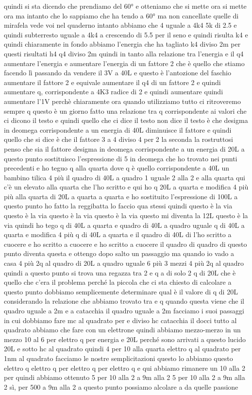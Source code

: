 \begin{soluzione}
   quindi si sta dicendo che prendiamo del 60° e otteniamo che si mette ora si mette ora ma intanto che lo sappiamo che ha tendo a 60° ma non cancellate quelle di mirafela vede voi nel quaderno intanto abbiamo che 4 uguale a 4k4 5k di 2.5 e quindi subterresto uguale a 4k4 a crescendo di 5.5 per il seno e quindi risulta k4 e quindi chiaramente in fondo abbiamo l'energia che ha tagliato k4 diviso 2m per questi risultati h4 q4 diviso 2m quindi in tanto alla relazione tra l'energia e il q4 aumentare l'energia e aumentare l'energia di un fattore 2 che è quello che stiamo facendo lì passando da vendere il 3V a 40L e questo è l'antozione del faschio aumentare il fattore 2 e equivale aumentare il q4 di un fattore 2 e quindi aumentare q, corrispondente a 4K3 radice di 2 e quindi aumentare quindi aumentare l'1V perchè chiaramente ora quando utilizziamo tutto ci ritroveremo sempre q questo è un giorno fatto una relazione tra q corrispondente ai valori che ci dicono il testo e quindi quello che ci dice il testo non dice il testo è che desigma in deomega corrispondente a un energia di 40L diminuisce il fattore e quindi quello che si dice è che il fattore 3 a 4 diviso 4 per 2 la seconda la rostruttosi penso che sia il fattore desigma in deomega corrispondente a un energia di 20L a questo punto sostituisco l'espressione di 5 in deomega che ho trovato nei punti precedenti e ho teguo q alla quarta dove q è quello corrispondente a 40L un bambino tilica 4 più il quadro di 40L a quadro 1 uguale 2 alla 2 e alla quarta qui c'è un elevato alla quarta che l'ho scritto e qui ho q 20L a quarta e modifica 4 più più alla quarta di 20L a quarta a quarta e ho sostituito l'espressione di 100L a questo punto ho fatto la reggibatta lo faccio qua stessi quindi questo è la via questo è la via questo è la via questo è la via questo mi diventa la 12L questo è la via quindi ho tego q di 40L a quarta e quadro di 40L a quadro uguale q di 40L a quarta e modifica 4 più q di 40L a quarta e il quadro di 40L di l'ho scritto a cuocere e ho scritto a cuocere e ho scritto a cuocere il quadro di quadro di questo punto diventa questa e ottengo dopo salto un passaggio ma quando io vado a casa 4 più 2q al quadro di 20L a quadro uguale 6 più 3 mezzi 4 più 2q al quadro quindi a questo punto si trova una regazza tra 2 e q a di solo 2 q di 20L che è quello che c'era il problema perché la piccola che ci sta chiesto di calcolare a questo punto dobbiamo semplicemente determinare qual è il valore di q di 20L considerando la relazione che abbiamo trovato tra e q quando questa viene che il quadro uguale a 2m e a catacchia il quadro uguale a 2m facciamo i suoi passaggi in cui dobbiamo fare mc al quadrato per e diviso hc catacchia il docci tutto al quadrato abbiamo che fare con un elettrone quindi abbiamo mezzo-merzo in un mezzo 10 al 6 per elettro q per energia e 20L perché sono arrivati a questo lucido 20L e sotto hc al quadrato quindi 4 per 10 alla quarta elettro q al quadrato per 1nm al quadrato facciamo le nostre semplicitazioni questo lo abbiamo questo elettro q elettro q per elettro q per elettro q e qui abbiamo rimanere un 10 alla 2 per quindi abbiamo ottenuto 5 per 10 alla 2 a 9m alla 2 5 per 10 alla 2 a 9m alla 2 sì, per 500 a 9m alla 2 a questo punto possiamo alcolare a da quelle passione 
   

\end{soluzione}
